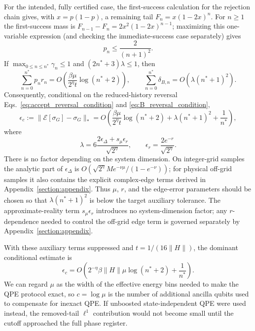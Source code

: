 \documentclass[aps,floatfix,10pt,amssymb,amsfont,amsmath,superscriptaddress,float,nofootinbib,longbibliography,nobalancelastpage,twocolumn]{revtex4-2}
\begin{document}
\begin{widetext}
For the intended, fully certified case, the first-success calculation for
the rejection chain gives, with $x=p(1-p)$, a remaining tail
$F_n=x(1-2x)^n$.  For $n\geq1$ the first-success mass is
$F_{n-1}-F_n=2x^2(1-2x)^{n-1}$; maximizing this one-variable expression
(and checking the immediate-success case separately) gives
\begin{equation*}
 p_n\leq\frac{2}{(n+1)^2}.
\end{equation*}
If $\max_{0\leq n\leq n^*}\gamma_n\leq1$ and
$(2n^*+3)\lambda\leq1$, then
\begin{equation*}
 \sum_{n=0}^{n^*}p_nr_n
 =O\left(\frac{\beta\mu}{2^\eta t}\log(n^*+2)\right),
 \qquad
 \sum_{n=0}^{n^*}\delta_{B,n}=O\left(\lambda(n^*+1)^2\right).
\end{equation*}
Consequently, conditional on the reduced-history reversal
Eqs.~\eqref{eq:accept_reversal_condition} and
\eqref{eq:B_reversal_condition},
\begin{equation}
 \epsilon_c:=\|\mathcal E[\sigma_G]-\sigma_G\|_*
 =O\left(
 \frac{\beta\mu}{2^\eta t}\log(n^*+2)
 +\lambda(n^*+1)^2+\frac1{n^*}\right),
 \label{eq:error_bound}
\end{equation}
where
\begin{equation*}
 \lambda=6\frac{2\epsilon_\Delta+s_\mu\epsilon_r}{\sqrt{2^\eta}},
 \qquad \epsilon_r=\frac{2e^{-r}}{\sqrt{2^\eta}}.
\end{equation*}
There is no factor depending on the system dimension.  On integer-grid
samples the analytic part of $\epsilon_\Delta$ is
$O(\sqrt{2^\eta}M e^{-\nu\mu}/(1-e^{-\nu}))$; for physical off-grid samples it also
contains the explicit complex-edge terms derived in
Appendix~\ref{section:appendix}.  Thus $\mu$, $r$, and the edge-error
parameters should be chosen so that
$\lambda(n^*+1)^2$ is below the target auxiliary tolerance.  The
approximate-reality term $s_\mu\epsilon_r$ introduces no system-dimension
factor; any $r$-dependence needed to control the off-grid edge term is
governed separately by Appendix~\ref{section:appendix}.

With these auxiliary terms suppressed and $t=1/(16\|H\|)$, the dominant
conditional estimate is
\begin{equation}
 \epsilon_c
 =O\left(2^{-\eta}\beta\|H\|\mu\log(n^*+2)+\frac1{n^*}\right).
 \label{eq:error_bound_simplified}
\end{equation}
We can regard $\mu$ as the width of the effective energy bins needed to
make the QPE protocol exact, so $c=\log\mu$ is the number of additional
ancilla qubits used to compensate for inexact QPE.  If unboosted
state-independent QPE were used instead, the removed-tail $\ell^1$
contribution would not become small until the cutoff approached the full
phase register.
\end{widetext}
\end{document}
